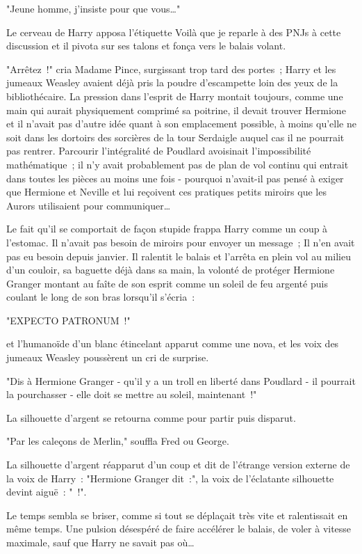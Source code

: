 "Jeune homme, j'insiste pour que vous…"

Le cerveau de Harry apposa l'étiquette Voilà que je reparle à des PNJs à cette discussion et il pivota sur ses talons et fonça vers le balais volant.

"Arrêtez~!" cria Madame Pince, surgissant trop tard des portes~; Harry et les jumeaux Weasley avaient déjà pris la poudre d'escampette loin des yeux de la bibliothécaire. La pression dans l'esprit de Harry montait toujours, comme une main qui aurait physiquement comprimé sa poitrine, il devait trouver Hermione et il n'avait pas d'autre idée quant à son emplacement possible, à moins qu'elle ne soit dans les dortoirs des sorcières de la tour Serdaigle auquel cas il ne pourrait pas rentrer. Parcourir l'intégralité de Poudlard avoisinait l'impossibilité mathématique~; il n'y avait probablement pas de plan de vol continu qui entrait dans toutes les pièces au moins une fois - pourquoi n'avait-il pas pensé à exiger que Hermione et Neville et lui reçoivent ces pratiques petits miroirs que les Aurors utilisaient pour communiquer…

Le fait qu'il se comportait de façon stupide frappa Harry comme un coup à l'estomac. Il n'avait pas besoin de miroirs pour envoyer un message~; Il n'en avait pas eu besoin depuis janvier. Il ralentit le balais et l'arrêta en plein vol au milieu d'un couloir, sa baguette déjà dans sa main, la volonté de protéger Hermione Granger montant au faîte de son esprit comme un soleil de feu argenté puis coulant le long de son bras lorsqu'il s'écria~:

"EXPECTO PATRONUM~!"

et l'humanoïde d'un blanc étincelant apparut comme une nova, et les voix des jumeaux Weasley poussèrent un cri de surprise.

"Dis à Hermione Granger - qu'il y a un troll en liberté dans Poudlard - il pourrait la pourchasser - elle doit se mettre au soleil, maintenant~!"

La silhouette d'argent se retourna comme pour partir puis disparut.

"Par les caleçons de Merlin," souffla Fred ou George.

La silhouette d'argent réapparut d'un coup et dit de l'étrange version externe de la voix de Harry~: "Hermione Granger dit~:", la voix de l'éclatante silhouette devint aiguë~: "~!".

Le temps sembla se briser, comme si tout se déplaçait très vite et ralentissait en même temps. Une pulsion désespéré de faire accélérer le balais, de voler à vitesse maximale, sauf que Harry ne savait pas où…

